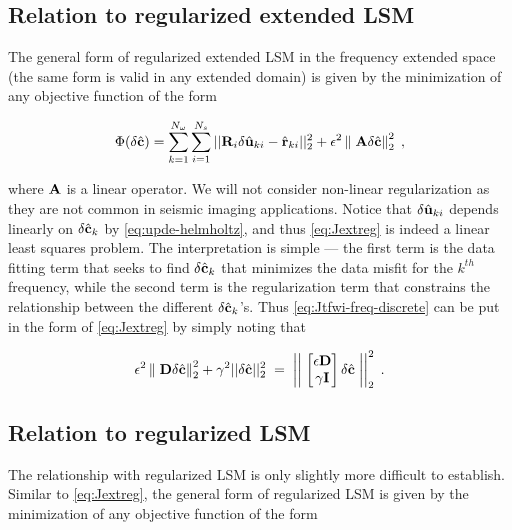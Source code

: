 \subsection{Relation to regularized extended LSM}

\vspace*{-0.1cm}
The general form of regularized extended LSM in the frequency extended space (the same form is valid in any extended domain) is given by the minimization of any objective function of the form

\vspace*{-0.6cm}
\begin{equation}
\Phi(\delta \hat{\mathbf{c}}) = \sum_{k=1}^{N_\omega} \sum_{i=1}^{N_s} ||\mathbf{R}_i \delta \hat{\mathbf{u}}_{ki} - \hat{\mathbf{r}}_{ki}||_2^2 + \epsilon^2 \left\lVert\; \mathbf{A} \delta \hat{\mathbf{c}} \right\rVert^2_2 \;,
\label{eq:Jextreg}
\end{equation}
\vspace*{-0.4cm}

where $\mathbf{A}$ is a linear operator. We will not consider non-linear regularization as they are not common in seismic imaging applications. Notice that $\delta \hat{\mathbf{u}}_{ki}$ depends linearly on $\delta \hat{\mathbf{c}}_k$ by \eqref{eq:upde-helmholtz}, and thus \eqref{eq:Jextreg} is indeed a linear least squares problem. The interpretation is simple --- the first term is the data fitting term that seeks to find $\delta \hat{\mathbf{c}}_k$ that minimizes the data misfit for the $k^{th}$ frequency, while the second term is the regularization term that constrains the relationship between the different $\delta \hat{\mathbf{c}}_k$'s. Thus \eqref{eq:Jtfwi-freq-discrete} can be put in the form of \eqref{eq:Jextreg} by simply noting that

\vspace*{-0.5cm}
\begin{equation}
\epsilon^2 \left\lVert\; \mathbf{D} \delta \hat{\mathbf{c}} \right\rVert^2_2 + \gamma^2 ||\delta \hat{\mathbf{c}}||^2_2 \; = \; \left| \left| \; 
\begin{bmatrix}
\epsilon \mathbf{D} \\
\gamma \mathbf{I}
\end{bmatrix}
\delta \hat{\mathbf{c}} \; \right| \right|_2^2 \;.
\label{eq:Jextreg_relation}
\end{equation}
\vspace*{-0.5cm}

\subsection{Relation to regularized LSM}

\vspace*{-0.1cm}
The relationship with regularized LSM is only slightly more difficult to establish. Similar to \eqref{eq:Jextreg}, the general form of regularized LSM is given by the minimization of any objective function of the form

